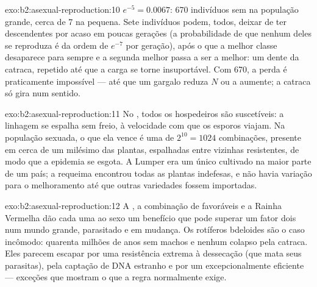 \begin{solution}{exo:b2:asexual-reproduction:10}
$e^{-5} = 0.0067$: 670 indivíduos sem  na população grande,
cerca de 7 na pequena. Sete indivíduos podem, todos, deixar de ter
descendentes por acaso em poucas gerações (a probabilidade de que
nenhum deles se reproduza é da ordem de $e^{-7}$ por geração), após o
que a melhor classe desaparece para sempre e a segunda melhor passa a
ser a melhor: um dente da catraca, repetido até que a carga se torne
insuportável. Com 670, a perda é praticamente impossível --- até que um
gargalo reduza $N$ ou a  aumente; a catraca só gira num
sentido.
\end{solution}

\begin{solution}{exo:b2:asexual-reproduction:11}
No , todos os hospedeiros são suscetíveis: a linhagem se espalha
sem freio, à velocidade com que os esporos viajam. Na população
sexuada, o  que ela vence é uma de $2^{10} = 1024$
combinações, presente em cerca de um milésimo das plantas, espalhadas
entre vizinhas resistentes, de modo que a epidemia se esgota. A Lumper
era um único  cultivado na maior parte de um país; a requeima
encontrou todas as plantas indefesas, e não havia variação para o
melhoramento até que outras variedades fossem importadas.
\end{solution}

\begin{solution}{exo:b2:asexual-reproduction:12}
A , a combinação de  favoráveis e a Rainha
Vermelha dão cada uma ao sexo um benefício que pode superar um fator
dois num mundo grande, parasitado e em mudança. Os rotíferos bdeloides
são o caso incômodo: quarenta milhões de anos sem machos e nenhum
colapso pela catraca. Eles parecem escapar por uma resistência extrema
à dessecação (que mata seus parasitas), pela captação de DNA estranho e
por um  excepcionalmente eficiente --- exceções que
mostram o que a regra normalmente exige.
\end{solution}

